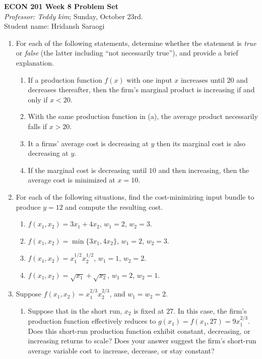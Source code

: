 \documentclass[11pt]{article}
\begin{document}
\begin{center}
\textbf{ECON 201 Week 8 Problem Set}\\
\textit {Professor: Teddy kim};  
Sunday, October 23rd.
\\Student name: Hridansh Saraogi
\end{center}

\begin{enumerate}
\item For each of the following statements, determine whether
the statement is \emph{true} or \emph{false} (the latter including ``not necessarily true''), and provide a brief explanation.
    \begin{enumerate}
        \item If a production function $f(x)$ with one input $x$ increases until $20$ and decreases thereafter, then the firm's marginal product is increasing if and only if $x<20$.

        \item With the same production function in (a), the average product necessarily falls if $x>20$.

         \item It a firms' average cost is decreasing at $y$ then its marginal cost is also decreasing at $y$.

        \item If the marginal cost is decreasing until $10$ and then increasing, then the average cost is minimized at $x=10$.

    \end{enumerate}

\item For each of the following situations, find the cost-minimizing input bundle to produce $y=12$ and compute the resulting cost.
    \begin{enumerate}
        \item $f(x_{1},x_{2})=3x_{1}+4x_{2}$, $w_{1}=2$, $w_{2}=3$.

        \item $f(x_{1},x_{2})=\min\{3x_{1},4x_{2}\}$, $w_{1}=2$, $w_{2}=3$.

        \item $f(x_{1},x_{2})=x_{1}^{1/2}x_{2}^{1/2}$, $w_{1}=1$, $w_{2}=2$.

        \item $f(x_{1},x_{2})=\sqrt{x_{1}}+\sqrt{x_{2}}$, $w_{1}=2$, $w_{2}=1$.
    \end{enumerate}

\item Suppose $f(x_{1},x_{2})=x_{1}^{2/3}x_{2}^{2/3}$, and $w_{1}=w_{2}=2$.
    \begin{enumerate}
        \item Suppose that in the short run, $x_{2}$ is fixed at $27$. In this case, the firm's production function effectively reduces to $g(x_{1})=f(x_{1},27)=9x_{1}^{2/3}$. Does this short-run production function exhibit constant, decreasing, or increasing returns to scale? Does your answer suggest the firm's short-run average variable cost to increase, decrease, or stay constant?


\end{enumerate}
\end{enumerate}
\end{document}
